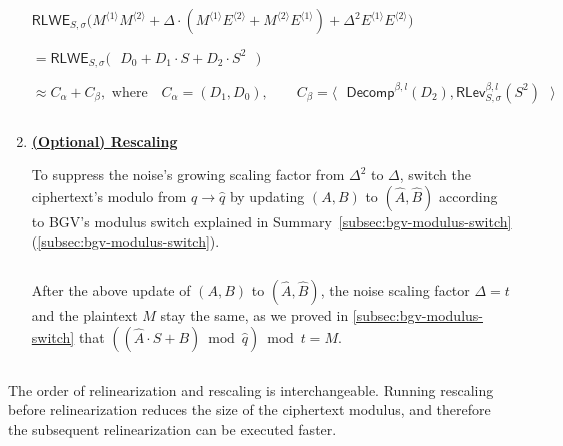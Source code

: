 \begin{tcolorbox}[title={\textbf{\tboxlabel{\ref*{subsec:bgv-mult-cipher}} BGV Ciphertext-to-Ciphertext Multiplication}}]
\begin{enumerate}
$\textsf{RLWE}_{S, \sigma}\bm(M^{\langle 1 \rangle}M^{\langle 2 \rangle} + \Delta\cdot (M^{\langle 1 \rangle}E^{\langle 2 \rangle} + M^{\langle 2 \rangle}E^{\langle 1 \rangle}) + \Delta^2E^{\langle 1 \rangle}E^{\langle 2 \rangle}\bm) $

$= \textsf{RLWE}_{S, \sigma}\bm{(}\text{ }D_0 + D_1\cdot S + D_2\cdot S^2\text{ }\bm{)}$

$  \approx C_\alpha + C_\beta, \text{ where } \text{ } C_\alpha = (D_1, D_0), \text{ }\text{ }\text{ } C_\beta = \bm{\langle}  \text{ } \textsf{Decomp}^{\beta, l}(D_2), \textsf{RLev}_{S, \sigma}^{\beta, l}(S^2)  \text{ } \bm{\rangle}$ 

$ $

\item \textbf{\underline{(Optional) Rescaling}}

To suppress the noise's growing scaling factor from $\Delta^2$ to $\Delta$, switch the ciphertext's modulo from $q \rightarrow \hat q$ by updating $(A, B)$ to $(\hat A, \hat B)$ according to BGV's modulus switch explained in Summary~\ref*{subsec:bgv-modulus-switch} (\autoref{subsec:bgv-modulus-switch}).

$ $

After the above update of $(A, B)$ to $(\hat A, \hat B)$, the noise scaling factor $\Delta = t$ and the plaintext $M$ stay the same, as we proved in \autoref{subsec:bgv-modulus-switch} that $((\hat A \cdot S + B) \bmod \hat q) \bmod t = M$.

$ $



\end{enumerate}

 The order of relinearization and rescaling is interchangeable. Running rescaling before relinearization reduces the size of the ciphertext modulus, and therefore the subsequent relinearization can be executed faster. 

\end{tcolorbox}

